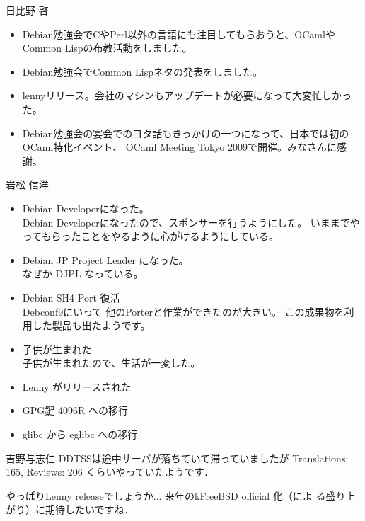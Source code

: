 \begin{prework}{日比野 啓}

\begin{itemize}

\item Debian勉強会でCやPerl以外の言語にも注目してもらおうと、OCamlやCommon Lispの布教活動をしました。
\item Debian勉強会でCommon Lispネタの発表をしました。

\end{itemize}


\begin{itemize}

\item lennyリリース。会社のマシンもアップデートが必要になって大変忙しかった。
\item Debian勉強会の宴会でのヨタ話もきっかけの一つになって、日本では初のOCaml特化イベント、 OCaml Meeting Tokyo 2009で開催。みなさんに感謝。

\end{itemize}

\end{prework}

\begin{prework}{岩松 信洋}
\begin{itemize}
\item Debian Developerになった。\\
Debian Developerになったので、スポンサーを行うようにした。
いままでやってもらったことをやるように心がけるようにしている。

\item Debian JP Project Leader になった。\\
なぜか DJPL なっている。

\item Debian SH4 Port 復活\\
Debconf9にいって 他のPorterと作業ができたのが大きい。
この成果物を利用した製品も出たようです。

\item 子供が生まれた\\
子供が生まれたので、生活が一変した。

\end{itemize}

\begin{itemize}
\item Lenny がリリースされた
\item GPG鍵 4096R への移行
\item glibc から eglibc への移行
\end{itemize}

\end{prework}

\begin{prework}{吉野与志仁}
 DDTSSは途中サーバが落ちていて滞っていましたが Translations: 165,
 Reviews: 206 くらいやっていたようです．

 やっぱりLenny releaseでしょうか... 来年のkFreeBSD official 化（によ
 る盛り上がり）に期待したいですね．
\end{prework}
